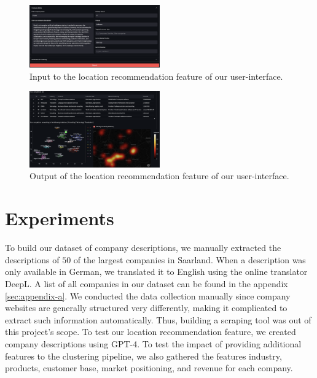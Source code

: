 \documentclass[conference]{IEEEtran}
\begin{document}
\begin{figure}[H]
	\centering
	\includegraphics[width=0.5\textwidth]{figures/location_recommendation_input.png}
	\caption{Input to the location recommendation feature of our user-interface.}
	\label{fig:location-recommendation-input}
\end{figure}
\begin{figure}[H]
	\centering
	\includegraphics[width=0.5\textwidth]{figures/location_recommendation_output.png}
	\caption{Output of the location recommendation feature of our user-interface.}
	\label{fig:location-recommendation-output}
\end{figure}

\section{Experiments}
To build our dataset of company descriptions, we manually extracted the descriptions of $50$ of the largest companies in Saarland. When a description was only available in German, we translated it to English using the online translator DeepL. A list of all companies in our dataset can be found in the appendix \ref{sec:appendix-a}. We conducted the data collection manually since company websites are generally structured very differently, making it complicated to extract such information automatically. Thus, building a scraping tool was out of this project's scope. To test our location recommendation feature, we created company descriptions using GPT-4.
To test the impact of providing additional features to the clustering pipeline, we also gathered the features industry, products, customer base, market positioning, and revenue for each company.
\end{document}
